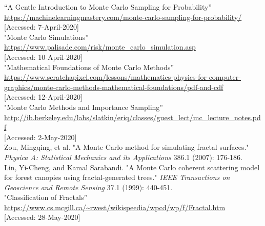 \documentclass{resonance}
\begin{document}
\setlength{\leftskip}{-4.2cm}
\begin{thebibliography}{99}

\vspace{5pt}
\setlength{\leftskip}{-3.8cm}
“A Gentle Introduction to Monte Carlo Sampling for Probability”\\ \textcolor{blue}{\url{https://machinelearningmastery.com/monte-carlo-sampling-for-probability/}}\\
{[Accessed: 7-April-2020]}\\

"Monte Carlo Simulations”\\ \textcolor{blue}{\url{https://www.palisade.com/risk/monte_carlo_simulation.asp}}\\
{[Accessed: 10-April-2020]}\\

"Mathematical Foundations of Monte Carlo Methods”\\ \textcolor{blue}{\url{https://www.scratchapixel.com/lessons/mathematics-physics-for-computer-graphics/monte-carlo-methods-mathematical-foundations/pdf-and-cdf}}\\
{[Accessed: 12-April-2020]}\\

"Monte Carlo Methods and Importance Sampling”\\ \textcolor{blue}{\url{http://ib.berkeley.edu/labs/slatkin/eriq/classes/guest\_lect/mc\_lecture\_notes.pdf }}\\
{[Accessed: 2-May-2020]}\\

Zou, Mingqing, et al. "A Monte Carlo method for simulating fractal surfaces." \textit{Physica A: Statistical Mechanics and its Applications} 386.1 (2007): 176-186.\\

Lin, Yi-Cheng, and Kamal Sarabandi. "A Monte Carlo coherent scattering model for forest canopies using fractal-generated trees." \textit{IEEE Transactions on Geoscience and Remote Sensing} 37.1 (1999): 440-451.\\

"Classification of Fractals”\\ \textcolor{blue}{\url{https://www.cs.mcgill.ca/~rwest/wikispeedia/wpcd/wp/f/Fractal.htm}}\\
{[Accessed: 28-May-2020]}\\


\end{thebibliography}
\end{document}
